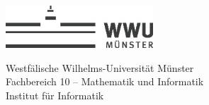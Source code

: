 %


\begin{titlepage}
	\tgherosfont
	
	\begin{minipage}[b]{0.4\textwidth}
	\begin{flushleft}
	\includegraphics[width=5.5cm,keepaspectratio]{img/wwulogo17.eps}\\[1cm]
	\end{flushleft}
	\end{minipage}
	\hfill
	\begin{minipage}[b]{0.5\textwidth}
	\begin{flushright}
	\footnotesize
	Westfälische Wilhelms-Universität Münster \\
	Fachbereich 10 -- Mathematik und Informatik \\
	Institut für Informatik
	\end{flushright}
	\end{minipage}
		


\end{titlepage}

